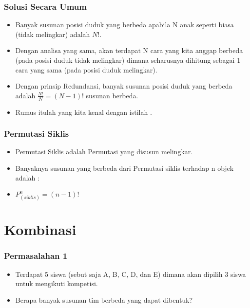 \begin{frame}
\frametitle{Solusi Secara Umum}
\begin{itemize}
  \item Banyak susunan posisi duduk yang berbeda apabila N anak seperti biasa (tidak melingkar) adalah $N!$.
  \item Dengan analisa yang sama, akan terdapat N cara yang kita anggap berbeda (pada posisi duduk tidak melingkar) dimana seharusnya dihitung sebagai 1 cara yang sama (pada posisi duduk melingkar).
  \item Dengan prinsip Redundansi, banyak susunan posisi duduk yang berbeda adalah $\frac{N!}{N} = (N-1)!$ susunan berbeda.
  \item Rumus itulah yang kita kenal dengan istilah .
\end{itemize}
\end{frame}

\begin{frame}
\frametitle{Permutasi Siklis}
\begin{itemize}
  \item Permutasi Siklis adalah Permutasi yang disusun melingkar.
  \item Banyaknya susunan yang berbeda dari Permutasi siklis terhadap n objek adalah :
  \item $P^{n}_{(siklis)} = (n-1)!$
\end{itemize}
\end{frame}

\section{Kombinasi}
\frame{\sectionpage}

\begin{frame}
\frametitle{Permasalahan 1}
\begin{itemize}
  \item Terdapat 5 siswa (sebut saja A, B, C, D, dan E) dimana akan dipilih 3 siswa untuk mengikuti kompetisi.
  \item Berapa banyak susunan tim berbeda yang dapat dibentuk?
\end{itemize}
\end{frame}

